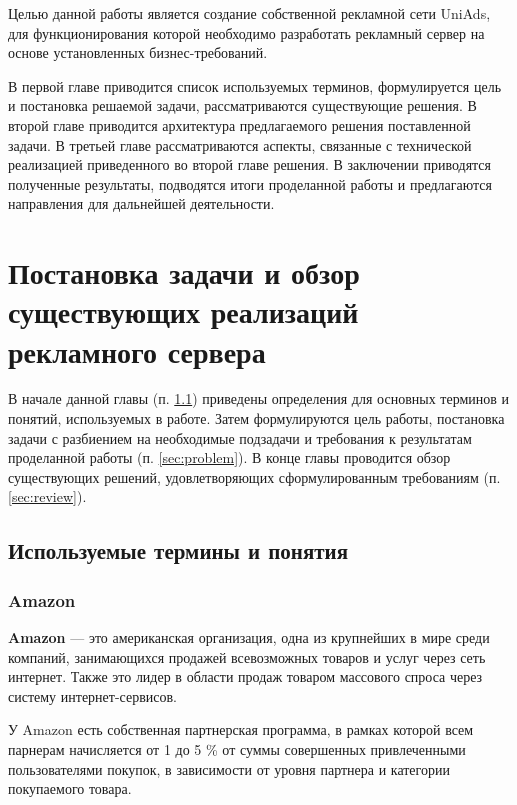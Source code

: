 \documentclass[specification,annotation,times]{itmo-student-thesis}
\begin{document}
Целью данной работы является создание собственной рекламной сети UniAds, для функционирования которой необходимо разработать рекламный сервер на основе установленных бизнес-требований.

В первой главе приводится список используемых терминов, формулируется цель и постановка решаемой задачи, рассматриваются существующие решения. В второй главе приводится архитектура предлагаемого решения поставленной задачи. В третьей главе рассматриваются аспекты, связанные с технической реализацией приведенного во второй главе решения. В заключении приводятся полученные результаты, подводятся итоги проделанной работы и предлагаются направления для дальнейшей деятельности.





\chapter{Постановка задачи и обзор существующих реализаций рекламного сервера}\label{chapter:1}

\startrelatedwork %

В начале данной главы (п. \ref{sec:terms}) приведены определения для основных терминов и понятий, используемых в работе. Затем формулируются цель работы, постановка задачи с разбиением на необходимые подзадачи и требования к результатам проделанной работы (п. \ref{sec:problem}). В конце главы проводится обзор существующих решений, удовлетворяющих сформулированным требованиям (п. \ref{sec:review}).

\section{Используемые термины и понятия} \label{sec:terms}

\subsection{Amazon \label{amazon}}

\textbf{Amazon} — это американская организация, одна из крупнейших в мире среди компаний, занимающихся продажей всевозможных товаров и услуг через сеть интернет. Также это лидер в области продаж товаром массового спроса через систему интернет-сервисов.

У Amazon есть собственная партнерская программа, в рамках которой всем парнерам начисляется от 1 до 5 \% от суммы совершенных привлеченными пользователями покупок, в зависимости от уровня партнера и категории покупаемого товара.
\end{document}
